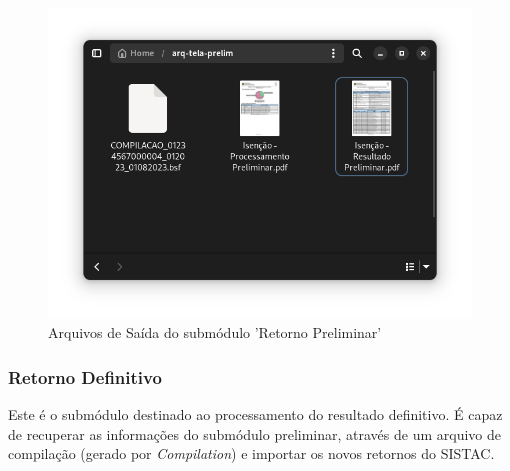 \documentclass[
	12pt,			%
	openright,		%
	oneside,	
	a4paper,		%
	english,		%
	brazil			%
]{abntex2/abntex2}  %
\begin{document}
	\begin{figure}[H]
		\begin{center}
			
			\caption{Arquivos de Saída do submódulo 'Retorno Preliminar'}
			\label{retorno-prelim-files}
			
			\includegraphics[scale=0.5]{img/retorno-prelim-files}
			
		\end{center}
	\end{figure}
	
	\subsubsection{Retorno Definitivo}
	
	Este é o submódulo destinado ao processamento do resultado definitivo. É capaz de recuperar as informações do submódulo preliminar, através de um arquivo de compilação (gerado por \textit{Compilation}) e importar os novos retornos do SISTAC.
\end{document}
